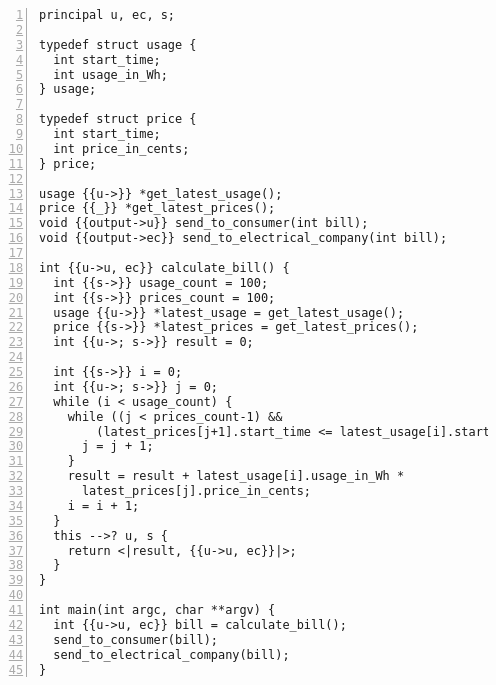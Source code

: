 \begin{lstlisting}[float, style=dlmc, numbers=left, caption={Labelled smart meter bill calculation example}, label=example:code:calculate_bill-explicit]
principal u, ec, s;

typedef struct usage {
  int start_time;
  int usage_in_Wh;
} usage;

typedef struct price {
  int start_time;
  int price_in_cents;
} price;

usage {{u->}} *get_latest_usage();
price {{_}} *get_latest_prices();
void {{output->u}} send_to_consumer(int bill);
void {{output->ec}} send_to_electrical_company(int bill);

int {{u->u, ec}} calculate_bill() {
  int {{s->}} usage_count = 100;
  int {{s->}} prices_count = 100;
  usage {{u->}} *latest_usage = get_latest_usage();
  price {{s->}} *latest_prices = get_latest_prices();
  int {{u->; s->}} result = 0;

  int {{s->}} i = 0;
  int {{u->; s->}} j = 0;
  while (i < usage_count) {
    while ((j < prices_count-1) &&
        (latest_prices[j+1].start_time <= latest_usage[i].start_time)) {
      j = j + 1;
    }
    result = result + latest_usage[i].usage_in_Wh *
      latest_prices[j].price_in_cents;
    i = i + 1;
  }
  this -->? u, s {
    return <|result, {{u->u, ec}}|>;
  }
}

int main(int argc, char **argv) {
  int {{u->u, ec}} bill = calculate_bill();
  send_to_consumer(bill);
  send_to_electrical_company(bill);
}
\end{lstlisting}
